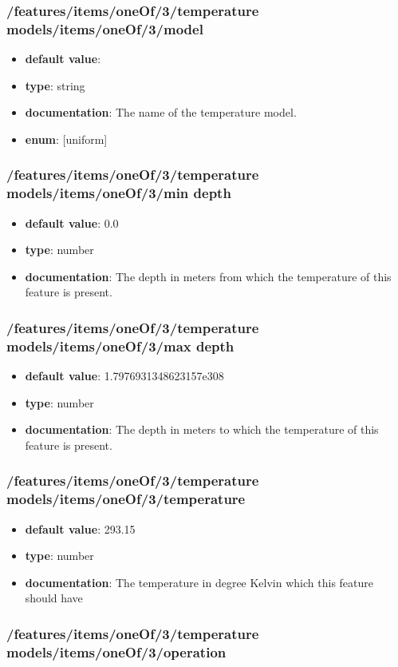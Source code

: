 \subsubsection{/features/items/oneOf/3/temperature models/items/oneOf/3/model}
\begin{itemize}\item {\bf default value}: 
\item {\bf type}: string
\item {\bf documentation}: The name of the temperature model.
\item {\bf enum}: [uniform]\end{itemize}\subsubsection{/features/items/oneOf/3/temperature models/items/oneOf/3/min depth}
\begin{itemize}\item {\bf default value}: 0.0
\item {\bf type}: number
\item {\bf documentation}: The depth in meters from which the temperature of this feature is present.
\end{itemize}\subsubsection{/features/items/oneOf/3/temperature models/items/oneOf/3/max depth}
\begin{itemize}\item {\bf default value}: 1.7976931348623157e308
\item {\bf type}: number
\item {\bf documentation}: The depth in meters to which the temperature of this feature is present.
\end{itemize}\subsubsection{/features/items/oneOf/3/temperature models/items/oneOf/3/temperature}
\begin{itemize}\item {\bf default value}: 293.15
\item {\bf type}: number
\item {\bf documentation}: The temperature in degree Kelvin which this feature should have
\end{itemize}\subsubsection{/features/items/oneOf/3/temperature models/items/oneOf/3/operation}
